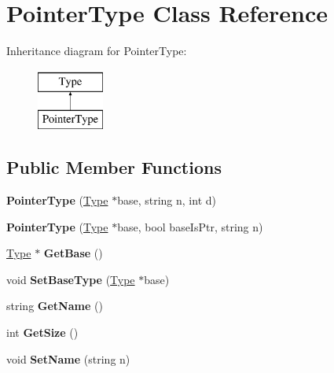 \hypertarget{classPointerType}{\section{Pointer\-Type Class Reference}
\label{classPointerType}
}
Inheritance diagram for Pointer\-Type\-:\begin{figure}[H]
\begin{center}
\leavevmode
\includegraphics[height=2.000000cm]{classPointerType}
\end{center}
\end{figure}
\subsection*{Public Member Functions}
\begin{DoxyCompactItemize}
\item 
\hypertarget{classPointerType_acb7c1bf4a82371e46d133a1471d1e3f3}{{\bfseries Pointer\-Type} (\hyperlink{classType}{Type} $\ast$base, string n, int d)}\label{classPointerType_acb7c1bf4a82371e46d133a1471d1e3f3}

\item 
\hypertarget{classPointerType_a58dbecb35ecd7ba2901db09aba00dcc7}{{\bfseries Pointer\-Type} (\hyperlink{classType}{Type} $\ast$base, bool base\-Is\-Ptr, string n)}\label{classPointerType_a58dbecb35ecd7ba2901db09aba00dcc7}

\item 
\hypertarget{classPointerType_acfdee349a0e18abd304f85d0b6d951ff}{\hyperlink{classType}{Type} $\ast$ {\bfseries Get\-Base} ()}\label{classPointerType_acfdee349a0e18abd304f85d0b6d951ff}

\item 
\hypertarget{classPointerType_abfb4082aafcedbe8660cfadabbe79f18}{void {\bfseries Set\-Base\-Type} (\hyperlink{classType}{Type} $\ast$base)}\label{classPointerType_abfb4082aafcedbe8660cfadabbe79f18}

\item 
\hypertarget{classType_a8143fe4686ae1a5709a5955396c6ee26}{string {\bfseries Get\-Name} ()}\label{classType_a8143fe4686ae1a5709a5955396c6ee26}

\item 
\hypertarget{classType_afe0fca035825759785b525d2a24f69fe}{int {\bfseries Get\-Size} ()}\label{classType_afe0fca035825759785b525d2a24f69fe}

\item 
\hypertarget{classType_ab8d2328a3a76289edf42b9bf0d4f278f}{void {\bfseries Set\-Name} (string n)}\label{classType_ab8d2328a3a76289edf42b9bf0d4f278f}

\end{DoxyCompactItemize}

